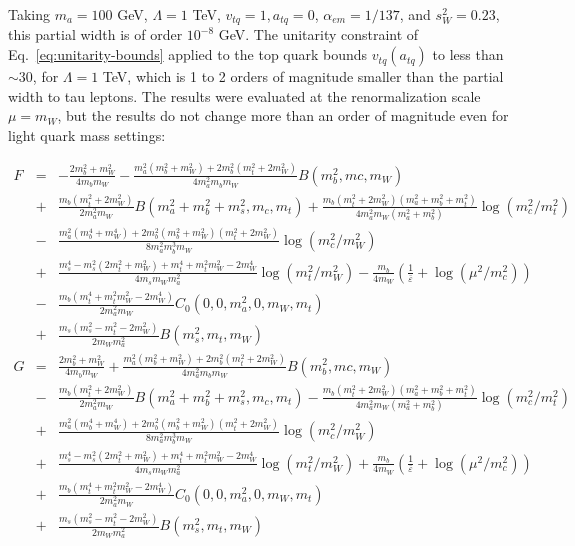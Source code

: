 \documentclass[prd,amsfonts,onecolumn,superscriptaddress,aps,nofootinbib,11pt]{revtex4-1}
\begin{document}
 Taking $m_a=100$ GeV, $\Lambda=1$ TeV, $v_{tq}=1, a_{tq}=0$, $\alpha_{em}=1/137$, and $s_W^2=0.23$, this partial width is of order $10^{-8}$ GeV. The unitarity constraint of Eq.~\eqref{eq:unitarity-bounds} applied to the top quark bounds $v_{tq}(a_{tq})$ to less than $\sim 30$, for $\Lambda=1$ TeV, which is 1 to 2 orders of magnitude smaller than the partial width to tau leptons. The results were evaluated at the renormalization scale $\mu=m_W$, but the results do not change more than an order of magnitude even for light quark mass settings:

 \begin{eqnarray*}
F &=& -\frac{2 m_b^2+m_W^2}{4
   m_b m_W} -\frac{m_a^2 \left(m_b^2+m_W^2\right)+2 m_b^2
   \left(m_t^2+2 m_W^2\right)}{4 m_a^2 m_b
   m_W} B(m_b^2, mc, m_W) \\
   & + & \frac{m_b (m_t^2+2 m_W^2)}{2 m_a^2
   m_W} B(m_a^2 + m_b^2 + m_s^2, m_c, m_t)+\frac{m_b \left(m_t^2+2 m_W^2\right)
   \left(m_a^2+m_b^2+m_t^2\right)}{4 m_a^2 m_W
   \left(m_a^2+m_b^2\right)}\log(m_c^2/m_t^2) \\
   &-& \frac{m_a^2 \left(m_b^4+m_W^4\right)+2 m_b^2
   \left(m_b^2+m_W^2\right) \left(m_t^2+2
   m_W^2\right)}{8 m_a^2 m_b^3 m_W}\log(m_c^2/m_W^2) \\
   &+& \frac{m_s^4-m_s^2 \left(2
   m_t^2+m_W^2\right)+m_t^4+m_t^2 m_W^2-2
   m_W^4}{4 m_s m_W m_a^2}\log(m_t^2/m_W^2) -\frac{m_b}{4 m_W}\left(\frac{1}{\bar{\varepsilon}}+\log(\mu^2/m_c^2)\right)\\
   &-& \frac{m_b \left(m_t^4+m_t^2 m_W^2-2
   m_W^4\right)}{2 m_a^2 m_W} C_0(0, 0, m_a^2, 0, m_W, m_t) \\
   &+& \frac{m_s \left(m_s^2-m_t^2-2 m_W^2\right)}{2
   m_W m_a^2} B(m_s^2, m_t, m_W) \\
   G &=& \frac{2 m_b^2+m_W^2}{4 m_b
   m_W} +\frac{m_a^2 \left(m_b^2+m_W^2\right)+2 m_b^2
   \left(m_t^2+2 m_W^2\right)}{4 m_a^2 m_b
   m_W} B(m_b^2, mc, m_W) \\
   &-& \frac{m_b \left(m_t^2+2 m_W^2\right)}{2 m_a^2
   m_W} B(m_a^2 + m_b^2 + m_s^2, m_c, m_t)-\frac{m_b \left(m_t^2+2 m_W^2\right)
   \left(m_a^2+m_b^2+m_t^2\right)}{4 m_a^2 m_W
   \left(m_a^2+m_b^2\right)}\log(m_c^2/m_t^2) \\
   &+& \frac{m_a^2 \left(m_b^4+m_W^4\right)+2 m_b^2
   \left(m_b^2+m_W^2\right) \left(m_t^2+2
   m_W^2\right)}{8 m_a^2 m_b^3 m_W}\log(m_c^2/m_W^2) \\
   &+& \frac{m_s^4-m_s^2 \left(2
   m_t^2+m_W^2\right)+m_t^4+m_t^2 m_W^2-2
   m_W^4}{4 m_s m_W m_a^2}\log(m_t^2/m_W^2)+\frac{m_b}{4 m_W}\left(\frac{1}{\bar{\varepsilon}}+\log(\mu^2/m_c^2)\right)\\
   &+& \frac{m_b \left(m_t^4+m_t^2 m_W^2-2
   m_W^4\right)}{2 m_a^2 m_W} C_0(0, 0, m_a^2, 0, m_W, m_t) \\
   & + & \frac{m_s \left(m_s^2-m_t^2-2 m_W^2\right)}{2
   m_W m_a^2} B(m_s^2, m_t, m_W)
\end{eqnarray*}
\end{document}
